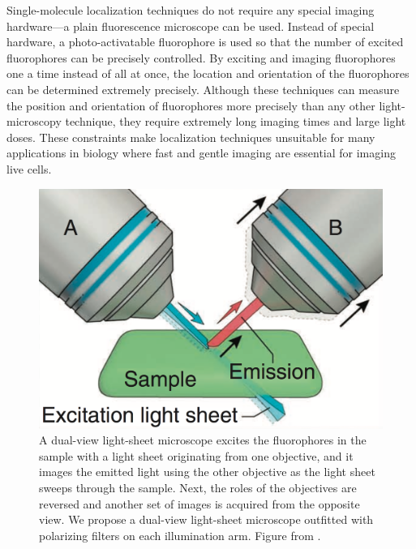\documentclass[11pt]{article}
\begin{document}
Single-molecule localization techniques do not require any special imaging
hardware---a plain fluorescence microscope can be used. Instead of special
hardware, a photo-activatable fluorophore is used so that the number of
excited fluorophores can be precisely controlled. By exciting and imaging
fluorophores one a time instead of all at once, the location and orientation of
the fluorophores can be determined extremely precisely. Although these techniques
can measure the position and orientation of fluorophores more precisely than any
other light-microscopy technique, they require extremely long imaging times and
large light doses. These constraints make localization techniques unsuitable for
many applications in biology where fast and gentle imaging are essential for
imaging live cells.

\begin{figure}[t]
\centering
\begin{minipage}{.45\textwidth}
  \centering
  \includegraphics[width=\textwidth, interpolate=true]{figs/light-sheet}
  \caption{A dual-view light-sheet microscope excites the fluorophores in the
    sample with a light sheet originating from one objective, and it images the
    emitted light using the other objective as the light sheet sweeps through
    the sample. Next, the roles of the objectives are reversed and another set
    of images is acquired from the opposite view. We propose a dual-view
    light-sheet microscope outfitted with polarizing filters on each illumination
    arm. Figure from \cite{wu2013}.}
  \label{fig:dispim}
\end{minipage}%
\hspace{0.75em}
\begin{minipage}{.45\textwidth}

\end{minipage}
\end{figure}
\end{document}
